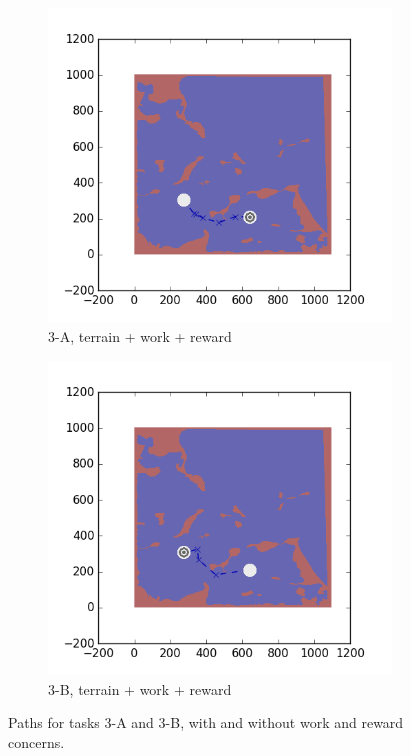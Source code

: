 \documentclass{tamuccthesis}
\begin{document}
\begin{figure}[H]
  \begin{subfigure}[b]{0.35\textwidth}  
        \centering
        \includegraphics[width=\textwidth,trim={4cm 3cm 2cm 3cm},clip]{EXP3RG_PathCa_-1_-1_-1_-1.png}
        \caption{\small{3-A, terrain + work + reward}}
        \label{fig:Path_3-A_terrain_work_reward}
    \end{subfigure}
    \hfill
    \begin{subfigure}[b]{0.35\textwidth}  
        \centering 
        \includegraphics[width=\textwidth,trim={4cm 3cm 2cm 3cm},clip]{EXP3RG_PathCb_-1_-1_-1_-1.png}
        \caption{\small{3-B, terrain + work + reward}}
        \label{fig:Path_3-B_terrain_work_reward}
    \end{subfigure}
    \caption{Paths for tasks 3-A and 3-B, with and without work and reward concerns.} 
    \label{fig:Paths_3-A_3-B}
\end{figure}
\end{document}
